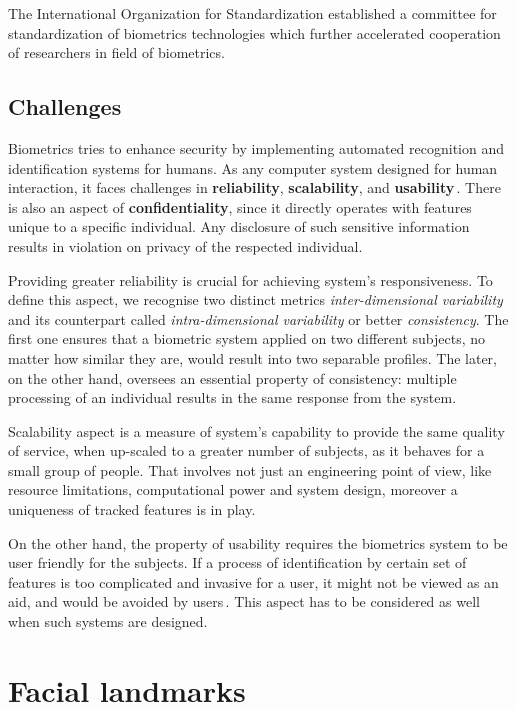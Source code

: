 The International Organization for Standardization established a committee for standardization of biometrics technologies which further accelerated cooperation of researchers in field of biometrics.

\subsection{Challenges}

Biometrics tries to enhance security by implementing automated recognition and identification systems for humans. As any computer system designed for human interaction, it faces challenges in \textbf{reliability}, \textbf{scalability}, and \textbf{usability}\,\cite{nodal_points}. There is also an aspect of \textbf{confidentiality}, since it directly operates with features unique to a specific individual. Any disclosure of such sensitive information results in violation on privacy of the respected individual.

Providing greater reliability is crucial for achieving system's responsiveness. To define this aspect, we recognise two distinct metrics \textit{inter-dimensional variability} and its counterpart called \textit{intra-dimensional variability} or better \textit{consistency}. The first one ensures that a biometric system applied on two different subjects, no matter how similar they are, would result into two separable profiles. The later, on the other hand, oversees an essential property of consistency: multiple processing of an individual results in the same response from the system.

Scalability aspect is a measure of system's capability to provide the same quality of service, when up-scaled to a greater number of subjects, as it behaves for a small group of people. That involves not just an engineering point of view, like resource limitations, computational power and system design, moreover a uniqueness of tracked features is in play.

On the other hand, the property of usability requires the biometrics system to be user friendly for the subjects. If a process of identification by certain set of features is too complicated and invasive for a user, it might not be viewed as an aid, and would be avoided by users\,\cite{nieto2002public}. This aspect has to be considered as well when such systems are designed.

\section{Facial landmarks}

